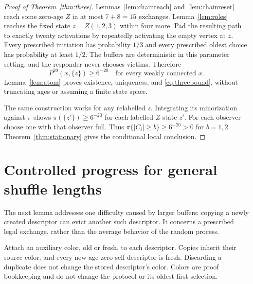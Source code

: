 \documentclass[11pt]{article}
\begin{document}
\begin{proof}[Proof of Theorem~\ref{thm:three}]
Lemmas~\ref{lem:chainreach} and~\ref{lem:chainreset} reach some
zero-age $Z$ in at most $7+8=15$ exchanges.
Lemma~\ref{lem:roles} reaches the fixed state $z=Z(1,2,3)$
within four more. Pad the resulting path to exactly twenty
activations by repeatedly activating the empty vertex at $z$.
Every prescribed initiation has probability $1/3$ and every
prescribed oldest choice has probability at least $1/2$.
The buffers are deterministic in this parameter setting, and the
responder never chooses victims. Therefore
\[
 P^{20}(x,\{z\})\ge6^{-20}\quad\text{for every weakly connected }x.
\]
Lemma~\ref{lem:atom} proves existence, uniqueness, and
\eqref{eq:threebound}, without truncating ages or assuming a finite
state space.

The same construction works for any relabelled $z$.
Integrating its minorization against $\pi$ shows
$\pi(\{z'\})\ge6^{-20}$ for each labelled $Z$ state $z'$.
For each observer choose one with that observer full. Thus
$\pi\{|C_i|\ge b\}\ge6^{-20}>0$ for $b=1,2$.
Theorem~\ref{thm:stationary} gives the conditional local conclusion.
\end{proof}

\section{Controlled progress for general shuffle lengths}
\label{sec:fresh}

The next lemma addresses one difficulty caused by larger buffers:
copying a newly created descriptor can evict another such descriptor.
It concerns a prescribed legal exchange, rather than the average
behavior of the random process.

Attach an auxiliary color, old or fresh, to each descriptor.
Copies inherit their source color, and every new age-zero self
descriptor is fresh. Discarding a duplicate does not change the
stored descriptor's color. Colors are proof bookkeeping and do
not change the protocol or its oldest-first selection.
\end{document}
